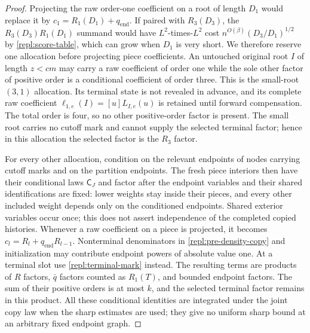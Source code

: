 \begin{proof}
Projecting the raw order-one coefficient on a root of length $D_1$ would
replace it by $c_1=R_1(D_1)+q_{\mathrm{end}}$.  If paired with $R_3(D_3)$,
the $R_3(D_3)R_1(D_1)$ summand would have $L^2$-times-$L^2$ cost
$n^{O(\beta)}(D_3/D_1)^{1/2}$ by \eqref{repl:score-table}, which can grow
when $D_1$ is very short.  We therefore reserve one allocation before
projecting piece coefficients.
An untouched original root $I$ of length $z<cm$ may carry a raw coefficient
of order one while the sole other factor of positive order is a conditional
coefficient of order three.
This is the small-root $(3,1)$ allocation.  Its terminal state
is not revealed in advance, and its complete raw coefficient
$\ell_{1,e}(I)=[u]L_{I,e}(u)$ is retained until forward compensation.
The total order is four, so no other positive-order factor is present.
The small root carries no cutoff mark and cannot supply the selected terminal
factor; hence in this allocation the selected factor is the $R_3$ factor.

For every other allocation, condition on the relevant endpoints of nodes
carrying cutoff marks and on the partition endpoints.  The fresh piece
interiors then have their conditional laws $\mathsf C_J$ and factor after
the endpoint variables and their shared identifications are fixed: lower
weights stay inside their pieces, and every other included weight depends
only on the conditioned endpoints.  Shared exterior variables occur once;
this does not assert independence of the completed copied histories.
Whenever a raw coefficient on a piece is projected, it becomes
$c_l=R_l+q_{\mathrm{end}}R_{l-1}$.  Nonterminal denominators in
\eqref{repl:pre-density-copy} and initialization may contribute endpoint
powers of absolute value one.  At a terminal slot use
\eqref{repl:terminal-mark} instead.  The resulting terms are products of
$R$ factors, $\bar q$ factors counted as $R_1(T)$, and bounded endpoint
factors.  The sum of their positive orders is at most $k$, and the selected
terminal factor remains in this product.  All these conditional identities
are integrated under the joint copy law when the sharp estimates are used;
they give no uniform sharp bound at an arbitrary fixed endpoint graph.


\end{proof}
